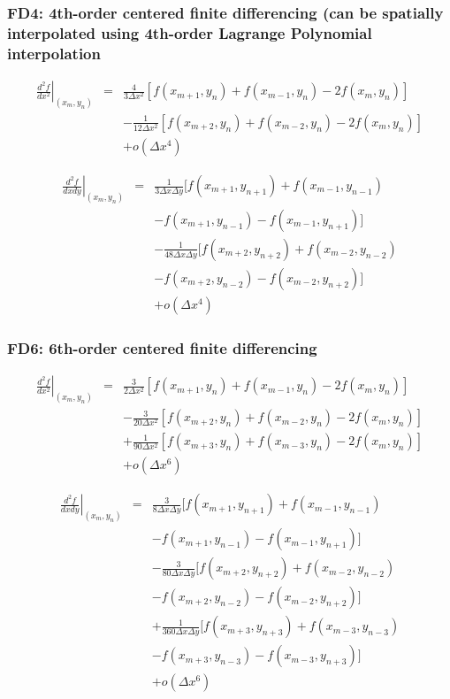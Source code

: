 \documentclass[11pt]{article}
\def\bea{\begin{eqnarray}}
\def\eea{\end{eqnarray}}
\begin{document}
\subsubsection*{FD4: 4th-order centered finite differencing (can be spatially
interpolated using 4th-order Lagrange Polynomial interpolation}
\bea \left.\frac{d^2f}{dx^2}\right|_{(x_m,y_n)} &=&
\frac{4}{3\Delta
x^2}[f(x_{m+1},y_n)+f(x_{m-1},y_n)-2f(x_m,y_n)]\nonumber\\
&&-\frac{1}{12\Delta
x^2}[f(x_{m+2},y_n)+f(x_{m-2},y_n)-2f(x_m,y_n)]\nonumber\\
&&+o(\Delta x^4) \eea

\bea \left.\frac{d^2f}{dxdy}\right|_{(x_m,y_n)} &=&
\frac{1}{3\Delta
x\Delta y}[f(x_{m+1},y_{n+1})+f(x_{m-1},y_{n-1})\nonumber\\
&&-f(x_{m+1},y_{n-1})-f(x_{m-1},y_{n+1})]\nonumber\\
&&-\frac{1}{48\Delta
x\Delta y}[f(x_{m+2},y_{n+2})+f(x_{m-2},y_{n-2})\nonumber\\
&&-f(x_{m+2},y_{n-2})-f(x_{m-2},y_{n+2})]\nonumber\\
&&+o(\Delta x^4) \eea

\subsubsection*{FD6: 6th-order centered finite differencing}
\bea \left.\frac{d^2f}{dx^2}\right|_{(x_m,y_n)}
&=& \frac{3}{2\Delta
x^2}[f(x_{m+1},y_n)+f(x_{m-1},y_n)-2f(x_m,y_n)]\nonumber\\
&&-\frac{3}{20\Delta
x^2}[f(x_{m+2},y_n)+f(x_{m-2},y_n)-2f(x_m,y_n)]\nonumber\\
&&+\frac{1}{90\Delta
x^2}[f(x_{m+3},y_n)+f(x_{m-3},y_n)-2f(x_m,y_n)]\nonumber\\
&&+o(\Delta x^6) \eea

\bea \left.\frac{d^2f}{dxdy}\right|_{(x_m,y_n)} &=&
\frac{3}{8\Delta
x\Delta y}[f(x_{m+1},y_{n+1})+f(x_{m-1},y_{n-1})\nonumber\\
&&-f(x_{m+1},y_{n-1})-f(x_{m-1},y_{n+1})]\nonumber\\
&&-\frac{3}{80\Delta
x\Delta y}[f(x_{m+2},y_{n+2})+f(x_{m-2},y_{n-2})\nonumber\\
&&-f(x_{m+2},y_{n-2})-f(x_{m-2},y_{n+2})]\nonumber\\
&&+\frac{1}{360\Delta
x\Delta y}[f(x_{m+3},y_{n+3})+f(x_{m-3},y_{n-3})\nonumber\\
&&-f(x_{m+3},y_{n-3})-f(x_{m-3},y_{n+3})]\nonumber\\
&&+o(\Delta x^6) \eea
\end{document}
